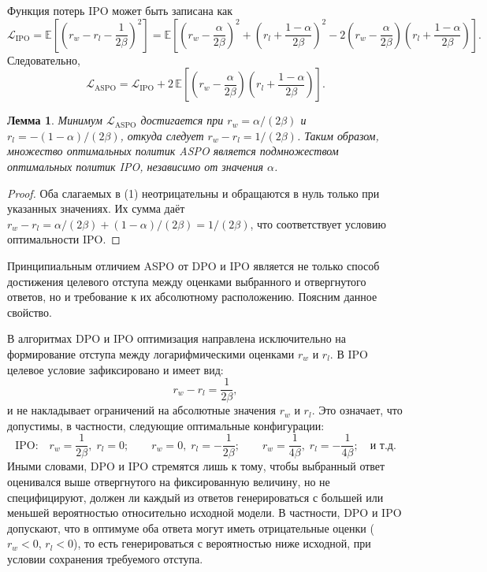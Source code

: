 \documentclass[a4paper,12pt]{article}
\newtheorem{lemma}{Лемма}
\begin{document}
Функция потерь IPO может быть записана как
\[
\mathcal{L}_{\text{IPO}} = \mathbb{E}\left[ \left( r_w - r_l - \frac{1}{2\beta} \right)^2 \right] = \mathbb{E}\left[ \left( r_w - \frac{\alpha}{2\beta} \right)^2 + \left( r_l + \frac{1-\alpha}{2\beta} \right)^2 - 2\left( r_w - \frac{\alpha}{2\beta} \right)\left( r_l + \frac{1-\alpha}{2\beta} \right) \right].
\]
Следовательно,
\[
\mathcal{L}_{\text{ASPO}} = \mathcal{L}_{\text{IPO}} + 2\,\mathbb{E}\left[ \left( r_w - \frac{\alpha}{2\beta} \right)\left( r_l + \frac{1-\alpha}{2\beta} \right) \right]. \tag{2}
\]


\begin{lemma} {Минимум $\mathcal{L}_{\text{ASPO}}$ достигается при $r_w = \alpha/(2\beta)$ и $r_l = -(1-\alpha)/(2\beta)$, откуда следует $r_w - r_l = 1/(2\beta)$. Таким образом, множество оптимальных политик ASPO является подмножеством оптимальных политик IPO, независимо от значения $\alpha$.}
\end{lemma}

\begin{proof} Оба слагаемых в (1) неотрицательны и обращаются в нуль только при указанных значениях. Их сумма даёт $r_w - r_l = \alpha/(2\beta) + (1-\alpha)/(2\beta) = 1/(2\beta)$, что соответствует условию оптимальности IPO. 
\end{proof}

Принципиальным отличием ASPO от DPO и IPO является не только способ достижения целевого отступа между оценками выбранного и отвергнутого ответов, но и требование к их абсолютному расположению. Поясним данное свойство.

В алгоритмах DPO и IPO оптимизация направлена исключительно на формирование отступа между логарифмическими оценками \(r_w\) и \(r_l\). В IPO целевое условие зафиксировано и имеет вид:
\[
r_w - r_l = \frac{1}{2\beta},
\]
и не накладывает ограничений на абсолютные значения \(r_w\) и \(r_l\). Это означает, что допустимы, в частности, следующие оптимальные конфигурации:
\[
\text{IPO:} \quad r_w = \frac{1}{2\beta}, \; r_l = 0; \qquad r_w = 0, \; r_l = -\frac{1}{2\beta}; \qquad r_w = \frac{1}{4\beta}, \; r_l = -\frac{1}{4\beta}; \quad \text{и т.д.}
\]
Иными словами, DPO и IPO стремятся лишь к тому, чтобы выбранный ответ оценивался выше отвергнутого на фиксированную величину, но не специфицируют, должен ли каждый из ответов генерироваться с большей или меньшей вероятностью относительно исходной модели. В частности, DPO и IPO допускают, что в оптимуме оба ответа могут иметь отрицательные оценки (\(r_w < 0\), \(r_l < 0\)), то есть генерироваться с вероятностью ниже исходной, при условии сохранения требуемого отступа.
\end{document}
